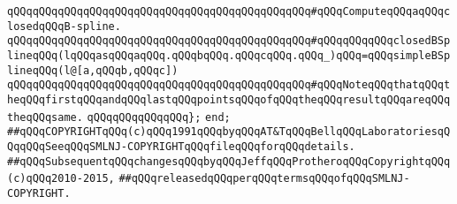 \verb|qQQqqQQqqQQqqQQqqQQqqQQqqQQqqQQqqQQqqQQqqQQqqQQq#qQQqComputeqQQqaqQQqclosedqQQqB-spline.|\newline
\verb|qQQqqQQqqQQqqQQqqQQqqQQqqQQqqQQqqQQqqQQqqQQqqQQq#qQQqqQQqqQQqclosedBSplineqQQq(lqQQqasqQQqaqQQq.qQQqbqQQq.qQQqcqQQq.qQQq_)qQQq=qQQqsimpleBSplineqQQq(l@[a,qQQqb,qQQqc])|\newline
\verb|qQQqqQQqqQQqqQQqqQQqqQQqqQQqqQQqqQQqqQQqqQQqqQQq#qQQqNoteqQQqthatqQQqtheqQQqfirstqQQqandqQQqlastqQQqpointsqQQqofqQQqtheqQQqresultqQQqareqQQqtheqQQqsame.|\newline
\verb|qQQqqQQqqQQqqQQq};|\newline
\verb|end;|\newline
\newline
\newline
\verb|##qQQqCOPYRIGHTqQQq(c)qQQq1991qQQqbyqQQqAT&TqQQqBellqQQqLaboratoriesqQQqqQQqSeeqQQqSMLNJ-COPYRIGHTqQQqfileqQQqforqQQqdetails.|\newline
\verb|##qQQqSubsequentqQQqchangesqQQqbyqQQqJeffqQQqProtheroqQQqCopyrightqQQq(c)qQQq2010-2015,|\newline
\verb|##qQQqreleasedqQQqperqQQqtermsqQQqofqQQqSMLNJ-COPYRIGHT.|\newline


